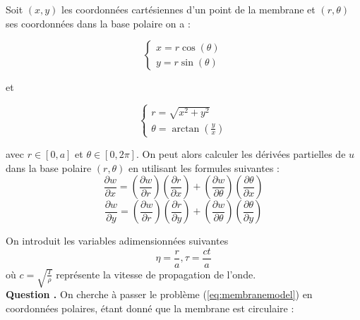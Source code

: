 \documentclass[a4,12pt]{article}
\newcounter{Nbquestion}
\newcommand*\question{%
  \stepcounter{Nbquestion}%
  \textbf{Question \theNbquestion. }}
\begin{document}
	      Soit $(x,y)$ les coordonnées cartésiennes d'un point de la membrane et $(r,\theta)$ ses coordonnées dans la base polaire on a :
	      \begin{center}
		\begin{minipage}[l]{.9\linewidth}

		  \begin{minipage}[l]{.4\linewidth}
		    \begin{equation*} 
		      \left\{ 
			\begin{array}{rcl}
			  x=r\cos(\theta) \\
			  y=r\sin(\theta)
			\end{array} 
			\right.
		      \end{equation*}
		    \end{minipage}
		    et
		    \begin{minipage}[r]{.4\linewidth}
		      \begin{equation*} 
			\left\{ 
			  \begin{array}{rcl}
			    r=\sqrt{x^2+y^2} \\
			    \theta=\arctan(\frac{y}{x})
			  \end{array} 
			  \right.
			\end{equation*}
		      \end{minipage}

		    \end{minipage}
		  \end{center}

		  avec $r \in[0,a]$ et $\theta  \in [0,2\pi]$. On peut alors calculer les dérivées partielles de $u$ dans la base polaire $(r,\theta)$ en utilisant les formules suivantes :
		  \[
		    \dfrac{\partial w}{\partial x}=\left(\dfrac{\partial w}{\partial r}\right)\left(\dfrac{\partial r}{\partial x}\right)+\left(\dfrac{\partial w}{\partial \theta}\right)\left(\dfrac{\partial \theta}{\partial x}\right)
		  \]
		  \[
		    \dfrac{\partial w}{\partial y}=\left(\dfrac{\partial w}{\partial r}\right)\left(\dfrac{\partial r}{\partial y}\right)+\left(\dfrac{\partial w}{\partial \theta}\right)\left(\dfrac{\partial \theta}{\partial y}\right)
		  \]

		  On introduit les variables adimensionnées suivantes 
		  \[
		    \eta=\dfrac{r}{a},\tau=\dfrac{ct}{a}
		  \]
		  où $c=\sqrt{\frac{T}{\rho}}$ représente la vitesse de propagation  de l'onde.\\ 


		  \question On cherche à passer le problème (\ref{eq:membranemodel}) en coordonnées polaires, étant donné que la membrane est circulaire :\\
\end{document}

